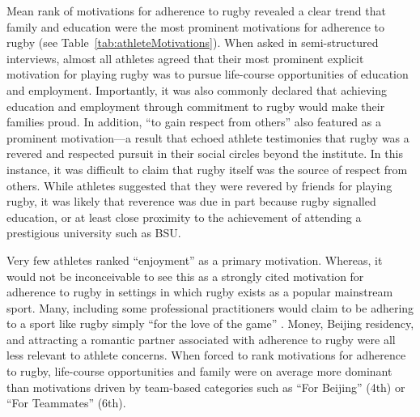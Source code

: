 \begin{CJK}{UTF8}{gbsn}
Mean rank of motivations for adherence to rugby revealed a clear trend that family and education were the most prominent motivations for adherence to rugby (see Table~\ref{tab:athleteMotivations}).  When asked in semi-structured interviews, almost all athletes agreed that their most prominent explicit motivation for playing rugby was to pursue life-course opportunities of education and employment.  Importantly, it was also commonly declared that achieving education and employment through commitment to rugby would make their families proud.  In addition, ``to gain respect from others'' also featured as a prominent motivation—a result that echoed athlete testimonies that rugby was a revered and respected pursuit in their social circles beyond the institute.  In this instance, it was difficult to claim that rugby itself was the source of respect from others. While athletes suggested that they were revered by friends for playing rugby, it was likely that reverence was due in part because rugby signalled education, or at least close proximity to the achievement of attending a prestigious university such as BSU.

Very few athletes ranked ``enjoyment'' as a primary motivation.  Whereas, it would not be inconceivable to see this as a strongly cited motivation for adherence to rugby in settings in which rugby exists as a popular mainstream sport.  Many, including some professional practitioners would claim to be adhering to a sport like rugby simply ``for the love of the game'' \citep{Jackson1998}.  Money, Beijing residency, and attracting a romantic partner associated with adherence to rugby were all less relevant to athlete concerns.  When forced to rank motivations for adherence to rugby, life-course opportunities and family were on average more dominant than motivations driven by team-based categories such as ``For Beijing'' (4th) or ``For Teammates'' (6th).

 


\end{CJK}
